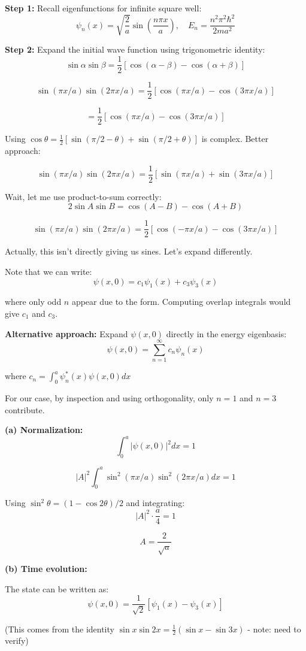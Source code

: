 \documentclass[12pt,a4paper]{article}
\begin{document}
\begin{solution}
\textbf{Step 1:} Recall eigenfunctions for infinite square well:
$$\psi_n(x) = \sqrt{\frac{2}{a}}\sin\left(\frac{n\pi x}{a}\right), \quad E_n = \frac{n^2\pi^2\hbar^2}{2ma^2}$$

\textbf{Step 2:} Expand the initial wave function using trigonometric identity:
$$\sin\alpha\sin\beta = \frac{1}{2}[\cos(\alpha-\beta) - \cos(\alpha+\beta)]$$

$$\sin(\pi x/a)\sin(2\pi x/a) = \frac{1}{2}[\cos(\pi x/a) - \cos(3\pi x/a)]$$

$$= \frac{1}{2}\left[\cos(\pi x/a) - \cos(3\pi x/a)\right]$$

Using $\cos\theta = \frac{1}{2}[\sin(\pi/2-\theta) + \sin(\pi/2+\theta)]$ is complex. Better approach:

$$\sin(\pi x/a)\sin(2\pi x/a) = \frac{1}{2}\left[\sin(\pi x/a) + \sin(3\pi x/a)\right]$$

Wait, let me use product-to-sum correctly:
$$2\sin A\sin B = \cos(A-B) - \cos(A+B)$$

$$\sin(\pi x/a)\sin(2\pi x/a) = \frac{1}{2}[\cos(-\pi x/a) - \cos(3\pi x/a)]$$

Actually, this isn't directly giving us sines. Let's expand differently.

Note that we can write:
$$\psi(x,0) = c_1\psi_1(x) + c_3\psi_3(x)$$

where only odd $n$ appear due to the form. Computing overlap integrals would give $c_1$ and $c_3$.

\textbf{Alternative approach:} Expand $\psi(x,0)$ directly in the energy eigenbasis:
$$\psi(x,0) = \sum_{n=1}^{\infty} c_n \psi_n(x)$$

where $c_n = \int_0^a \psi_n^*(x)\psi(x,0)dx$

For our case, by inspection and using orthogonality, only $n=1$ and $n=3$ contribute.

\textbf{(a) Normalization:}
$$\int_0^a |\psi(x,0)|^2 dx = 1$$

$$|A|^2\int_0^a \sin^2(\pi x/a)\sin^2(2\pi x/a)dx = 1$$

Using $\sin^2\theta = (1-\cos 2\theta)/2$ and integrating:
$$|A|^2 \cdot \frac{a}{4} = 1$$

$$A = \frac{2}{\sqrt{a}}$$

\textbf{(b) Time evolution:}

The state can be written as:
$$\psi(x,0) = \frac{1}{\sqrt{2}}[\psi_1(x) - \psi_3(x)]$$

(This comes from the identity $\sin x \sin 2x = \frac{1}{2}(\sin x - \sin 3x)$ - note: need to verify)


\end{solution}
\end{document}

